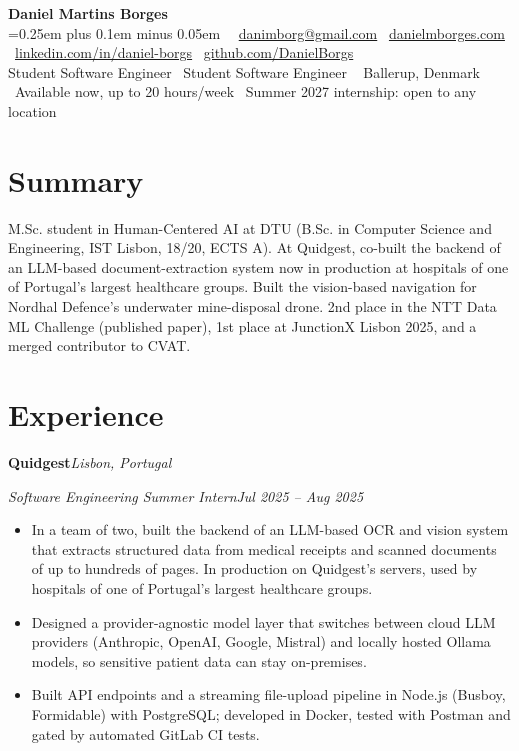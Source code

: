 \documentclass[11pt,a4paper]{article}
\newcommand{\entry}[2]{\Needspace{5\baselineskip}\textbf{#1}\hfill\textit{#2}\par\nopagebreak}
\newcommand{\role}[2]{\textit{#1}\hfill\textit{#2}\par\nopagebreak}
\begin{document}
\begin{center}
    {\LARGE\bfseries Daniel Martins Borges}\\[3pt]
    {\ifdefined\cvphone\small\spaceskip=0.25em plus 0.1em minus 0.05em\relax \cvphone\ \textbar\ \fi
    \href{mailto:danimborg@gmail.com}{danimborg@gmail.com} \textbar\
    \href{https://danielmborges.com}{danielmborges.com} \textbar\
    \href{https://linkedin.com/in/daniel-borgs}{linkedin.com/in/daniel-borgs} \textbar\
    \href{https://github.com/DanielBorgs}{github.com/DanielBorgs}}\\[2pt]
    \ifdefined\cvhidenow Student Software Engineer \textbar\ \else\ifdefined\cvhideinternship Student Software Engineer \textbar\ \fi\fi
    Ballerup, Denmark\ifdefined\cvhidenow\else{} \textbar\ Available now, up to 20 hours/week\fi
    \ifdefined\cvhideinternship\else{} \textbar\ Summer 2027 internship: open to any location\fi
\end{center}

\section*{Summary}
M.Sc. student in Human-Centered AI at DTU (B.Sc. in Computer Science and Engineering, IST Lisbon, 18/20, ECTS A). At Quidgest, co-built the backend of an LLM-based document-extraction system now in production at hospitals of one of Portugal's largest healthcare groups. Built the vision-based navigation for Nordhal Defence's underwater mine-disposal drone. 2nd place in the NTT Data ML Challenge (published paper), 1st place at JunctionX Lisbon 2025, and a merged contributor to CVAT.

\section*{Experience}
\entry{Quidgest}{Lisbon, Portugal}
\role{Software Engineering Summer Intern}{Jul 2025 -- Aug 2025}
\begin{itemize}
    \item In a team of two, built the backend of an LLM-based OCR and vision system that extracts structured data from medical receipts and scanned documents of up to hundreds of pages. In production on Quidgest's servers, used by hospitals of one of Portugal's largest healthcare groups.
    \item Designed a provider-agnostic model layer that switches between cloud LLM providers (Anthropic, OpenAI, Google, Mistral) and locally hosted Ollama models, so sensitive patient data can stay on-premises.
    \item Built API endpoints and a streaming file-upload pipeline in Node.js (Busboy, Formidable) with PostgreSQL; developed in Docker, tested with Postman and gated by automated GitLab CI tests.
\end{itemize}
\end{document}
